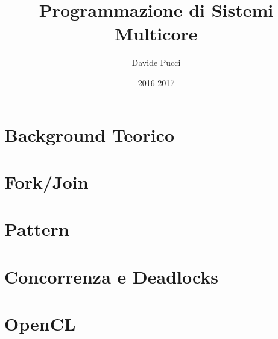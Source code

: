 

\title{Programmazione di Sistemi Multicore}
\author{Davide Pucci}
\date{2016-2017}


	
\maketitle
	
\tableofcontents

\chapter{Background Teorico}


\chapter{Fork/Join}


\chapter{Pattern}


\chapter{Concorrenza e Deadlocks}


\chapter{OpenCL}


